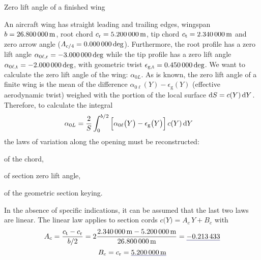\documentclass[[12pt,twoside]{book}
\begin{document}
%
\begin{myExampleX}{Zero lift angle of a finished wing}{}%
\label{example:Zero:Lift:Angle:Of:A:Finished:Wing}
%

%
An aircraft wing has straight leading and trailing edges, wingspan $b=\SI[round-precision=1]{\mySpanWingMT}{\metre}$,
root chord $c_\mathrm{r}=\SI[round-precision=2]{\myChordRootWingMT}{\metre}$,
tip chord $c_\mathrm{t}=\SI[round-precision=2]{\myChordTipWingMT}{\metre}$
and zero arrow angle ($\Lambda_{c/4}=\SI[round-precision=1]{\mySweepQuarterChordWingDEG}{\deg}$).
Furthermore, the root profile has a zero lift angle $\alpha_{0\ell,\mathrm{r}}=\SI[round-precision=1]{\myAlphaZeroLiftRootWingDEG}{\deg}$
while the tip profile has a zero lift angle
$\alpha_{0\ell,\mathrm{t}}=\SI[round-precision=1]{\myAlphaZeroLiftTipWingDEG}{\deg}$,
with geometric twist
$\epsilon_{\mathrm{g,t}}=\SI[round-precision=1]{\myTwistWingDEG}{\deg}$.
We want to calculate the zero lift angle of the wing: $\alpha_{0L}$.
\medskip
As is known, the zero lift angle of a finite wing is the mean of the difference $\alpha_{0\ell}(Y)-\epsilon_\mathrm{g}(Y)$ (effective aerodynamic twist) weighed with the portion of the local surface $\diff{S}=c(Y)\diff{Y}$. Therefore, to calculate the integral
\[
\begin{split}
\alpha_{0L} 
  & {}= \frac{2}{S} \int_0^{b/2} 
    \Big[ 
      \alpha_{0\ell}\big(Y\big) - \epsilon_\mathrm{g}\big(Y\big) 
    \Big] \, c(Y) \diff{Y}
\end{split}
\]
the laws of variation along the opening must be reconstructed:%
\begin{inparaenum}
\item
of the chord,
\item
of section zero lift angle, 
\item
of the geometric section keying.
\end{inparaenum}
In the absence of specific indications, it can be assumed that the last two laws are linear. The linear law applies to section cords
$c \big( Y \big) = A_c \, Y + B_c$ 
with
\[
A_c
  = \frac{c_\mathrm{t} - c_\mathrm{r}}{b/2}
  = 
    2 \frac{
      \SI[round-precision=2]{\myChordTipWingMT}{\metre} - \SI[round-precision=2]{\myChordRootWingMT}{\metre}
    }{
      \SI[round-precision=2]{\mySpanWingMT}{\metre}
    }
  = \mathunderline{mydarkblue}{ \SI[round-precision=3]{\myCoeffAChordWing}{} }
\]
\[
B_c
  = c_\mathrm{r}
  = \mathunderline{mydarkblue}{ \SI[round-precision=2]{\myCoeffBChordWingMT}{\metre} }
\]
\end{myExampleX}
\end{document}
